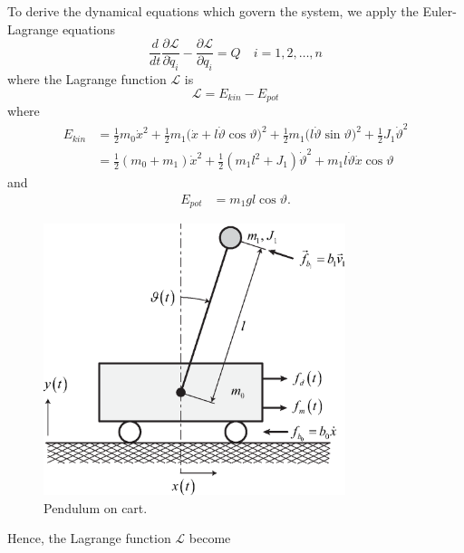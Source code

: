\documentclass[11pt,a4paper,oneside]{book}
\numberwithin{equation}{section}
\theoremstyle{it}
\theoremstyle{definition}
\begin{document}
To derive the dynamical equations which govern the system, we apply the 
Euler-Lagrange equations
\begin{equation}\label{pendulum_on_cart_1}
	\frac{d}{dt}\frac{\partial \mathcal{L}}{\partial \dot{q}_i} - 
	\frac{\partial \mathcal{L}}{\partial q_i} = Q\quad i=1,2,\dots,n
\end{equation}
where the Lagrange function $\mathcal{L}$ is
\begin{equation}\label{pendulum_on_cart_2}
	\mathcal{L}=E_{kin}-E_{pot}
\end{equation}
where 
\begin{equation}\label{pendulum_on_cart_3}
	\begin{aligned}
		E_{kin}&=\frac{1}{2}m_0\dot{x}^2 + \frac{1}{2}m_1\Big(\dot{x}+ 
		l\dot{\vartheta}\cos\vartheta\Big)^2 + \frac{1}{2}m_1\Big(
		l\dot{\vartheta}\sin\vartheta\Big)^2 + \frac{1}{2}J_1\dot{\vartheta}^2 
		\\[6pt]
		&=\frac{1}{2}(m_0+m_1)\dot{x}^2+\frac{1}{2}(m_1l^2+J_1)\dot{\vartheta}^2+
		m_1l\dot{\vartheta}\dot{x}\cos\vartheta
	\end{aligned}
\end{equation}
and
\begin{equation}\label{pendulum_on_cart_4}
	\begin{aligned}
		E_{pot}&=m_1gl\cos\vartheta.
	\end{aligned}
\end{equation}
\begin{figure}[H]
	\centering
	\includegraphics[height = 225pt, 
	keepaspectratio]{figures/pendulum_on_cart/pendulum_on_cart.eps}
	\captionsetup{width=0.75\textwidth}		
	\caption{Pendulum on cart.}
	\label{figure_pendulum_on_cart_1}
\end{figure}
Hence, the Lagrange function $\mathcal{L}$ become
\end{document}
